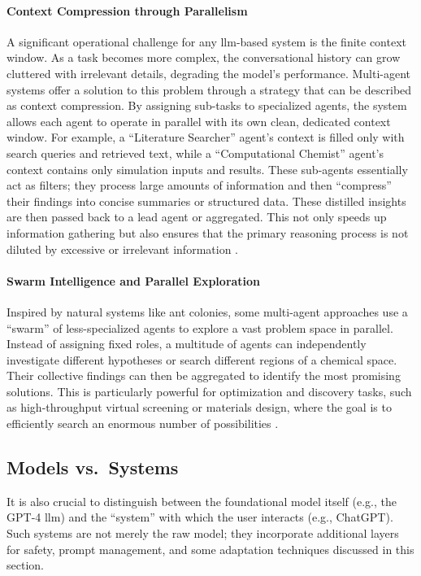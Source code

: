 \paragraph{Context Compression through Parallelism}
A significant operational challenge for any \gls{llm}-based system is the finite context window. 
As a task becomes more complex, the conversational history can grow cluttered with irrelevant details, degrading the model's performance.\autocite{chirkova2025provence0, lee2024long1context} 
Multi-agent systems offer a  solution to this problem through a strategy that can be described as context compression. 
By assigning sub-tasks to specialized agents, the system allows each agent to operate in parallel with its own clean, dedicated context window. 
For example, a \enquote{Literature Searcher} agent's context is filled only with search queries and retrieved text, while a \enquote{Computational Chemist} agent's context contains only simulation inputs and results. 
These sub-agents essentially act as filters; they process large amounts of information and then \enquote{compress} their findings into concise summaries or structured data. 
These distilled insights are then passed back to a lead agent or aggregated. 
This not only speeds up information gathering but also ensures that the primary reasoning process is not diluted by excessive or irrelevant information \autocite{Breunig2025HowToFixYourContext}.


\paragraph{Swarm Intelligence and Parallel Exploration}
Inspired by natural systems like ant colonies, some multi-agent approaches use a \enquote{swarm} of less-specialized agents to explore a vast problem space in parallel. Instead of assigning fixed roles, a multitude of agents can independently investigate different hypotheses or search different regions of a chemical space. Their collective findings can then be aggregated to identify the most promising solutions. This is particularly powerful for optimization and discovery tasks, such as high-throughput virtual screening or materials design, where the goal is to efficiently search an enormous number of possibilities \autocite{chen2023agentversefacilitatingmultiagentcollaboration}.

\subsection{Models vs.\ Systems}
It is also crucial to distinguish between the foundational model itself (e.g., the GPT-4 \gls{llm}) and the \enquote{system} with which the user interacts (e.g., ChatGPT). 
Such systems are not merely the raw model; they incorporate additional layers for safety, prompt management, and some adaptation techniques discussed in this section. 